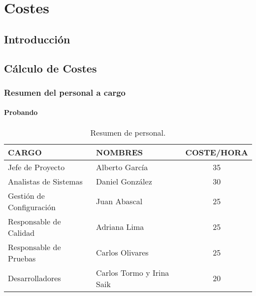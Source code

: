 \documentclass[10pt,a4paper,oldfontcommands]{plantillaDPDS}
\begin{document}
\pagecolor{fondo}
\color{principal}

\chapter{Costes}
\clearpage

\section{Introducción}


\section{Cálculo de Costes}
\subsection{Resumen del personal a cargo}

\subsubsection{Probando}


\begin{table}[H]
\begin{center}
\begin{tabular}{l l c}

\textbf{CARGO} & \textbf{NOMBRES} & \textbf{COSTE/HORA}\\ \hline \hline
Jefe de Proyecto & Alberto García & 35  \\
Analistas de Sistemas & Daniel González & 30\\
Gestión de Configuración & Juan Abascal & 25\\
Responsable de Calidad & Adriana Lima & 25\\
Responsable de Pruebas & Carlos Olivares & 25\\
Desarrolladores & Carlos Tormo y  Irina Saik & 20\\ \hline \hline
\end{tabular}
\caption{Resumen de personal.}
\label{tab:personal}
\end{center}
\end{table}
\end{document}
